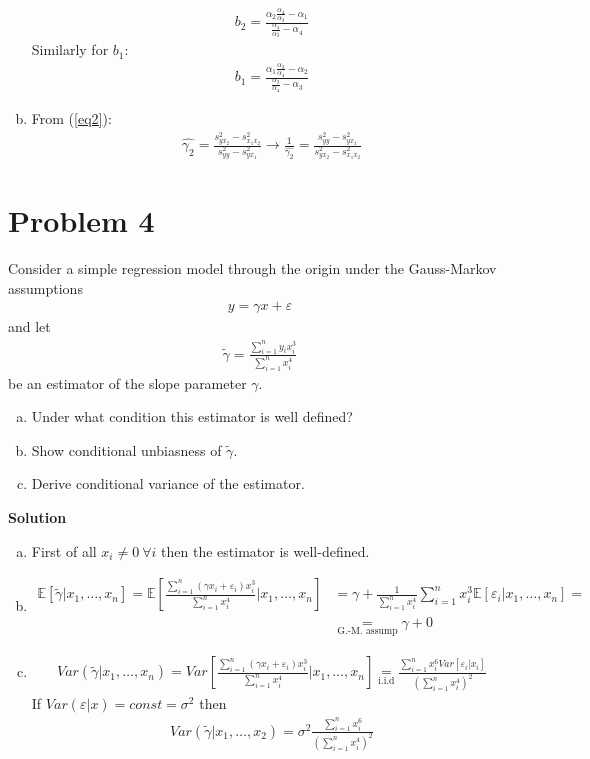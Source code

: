 \documentclass[a4paper]{article}
\newcommand{\expect}{\mathbb{E}}
\newcommand{\summa}{\sum_{i=1}^n}
\begin{document}
\begin{enumerate}[(a)]
	\begin{align*}
	b_2 = \frac{\alpha_2\frac{\alpha_4}{\alpha_3} - \alpha_1}{\frac{\alpha_4}{\alpha_3} - \alpha_4}
	\end{align*}
	Similarly for $b_1$:
	\begin{align*}
	b_1 = \frac{\alpha_1\frac{\alpha_3}{\alpha_4} - \alpha_2}{\frac{\alpha_3}{\alpha_4} - \alpha_3}
	\end{align*}
	\item From (\ref{eq2}):
	\begin{align*}
	\hat{\gamma_2} = \frac{s^2_{yx_2} - s^2_{x_1x_2}}{s^2_{yy} - s^2_{yx_1}} \to \frac{1}{\hat{\gamma_2}} = \frac{s^2_{yy} - s^2_{yx_1}}{s^2_{yx_2} - s^2_{x_1x_2}}
	\end{align*}
\end{enumerate}
\section*{Problem 4}
Consider a simple regression model through the origin under the Gauss-Markov assumptions
\begin{align*}
y = \gamma x + \varepsilon
\end{align*}
and let
\begin{align*}
\tilde{\gamma} = \frac{\summa y_ix_i^3}{\summa x_i^4}
\end{align*}
be an estimator of the slope parameter $\gamma$.
\begin{enumerate}[(a)]
\item Under what condition this estimator is well defined?
\item Show conditional unbiasness of $\tilde{\gamma}$.
\item Derive conditional variance of the estimator.
\end{enumerate}


\textbf{Solution}


\begin{enumerate}[(a)]
	\item First of all $x_i \neq 0\ \forall i$ then the estimator is well-defined.
	\item \begin{align*}
	\expect[\tilde{\gamma}|x_1, \dots, x_n] = \expect\left[\frac{\summa (\gamma x_i + \varepsilon_i)x_i^3}{\summa x_i^4}\bigg|x_1, \dots, x_n\right] &= \gamma + \frac{1}{\summa x_i^4} \summa x_i^3\expect[\varepsilon_i|x_1, \dots, x_n] =\\
	 &\underset{\text{G.-M. assump}}{=} \gamma + 0
	\end{align*}
	\item \begin{align*}
	Var(\tilde{\gamma}|x_1, \dots, x_n) = Var\left[\frac{\summa (\gamma x_i + \varepsilon_i)x_i^3}{\summa x_i^4}\bigg|x_1, \dots, x_n\right] \underset{\text{i.i.d}}{=} \frac{\summa x_i^6 Var[\varepsilon_i|x_i]}{\left(\summa x_i^4\right)^2} 
	\end{align*}
	If $Var(\varepsilon|x) = const = \sigma^2$ then
	\begin{align*}
	Var(\tilde{\gamma}|x_1, \dots, x_2) = \sigma^2 \frac{\summa x_i^6}{\left(\summa x_i^4\right)^2} 
	\end{align*}
\end{enumerate}
\end{document}
